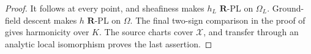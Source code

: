 \begin{proof}
It follows at every point, and sheafiness makes $h_L$ $\mathbf R$-PL on
$\Omega_L$.  Ground-field descent \cite[Corollary~5.12]{GJR26} makes $h$
$\mathbf R$-PL on $\Omega$.  The final two-sign comparison in the proof of
 gives harmonicity
over $K$.  The source charts cover $\mathcal X$, and transfer through an
analytic local isomorphism proves the last assertion.
\end{proof}
